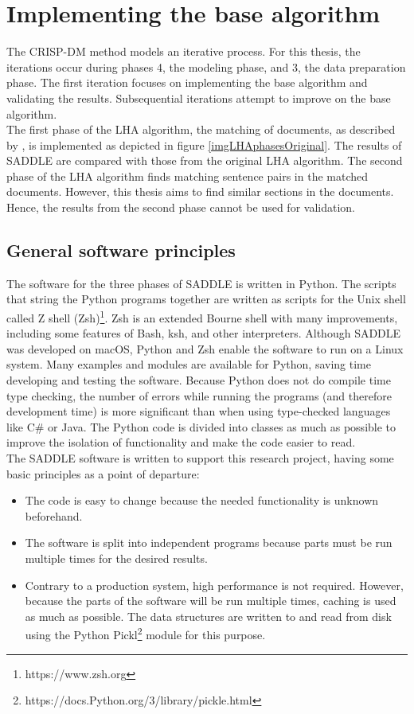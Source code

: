 \pagebreak
\chapter{Implementing the base algorithm}
\label{secRCIII}
The CRISP-DM method models an iterative process. For this thesis, the iterations occur during phases 4, the modeling phase, and 3, the data preparation phase. The first iteration focuses on implementing the base algorithm and validating the results. Subsequential iterations attempt to improve on the base algorithm.\\

The first phase of the LHA algorithm, the matching of documents, as described by \citet{nikolov2018large}, is implemented as depicted in figure \ref{imgLHAphasesOriginal}. The results of SADDLE are compared with those from the original LHA algorithm. The second phase of the LHA algorithm finds matching sentence pairs in the matched documents. However, this thesis aims to find similar sections in the documents. Hence, the results from the second phase cannot be used for validation. 

\section{General software principles}
\label{secGeneralPrinciples}

The software for the three phases of SADDLE is written in Python. The scripts that string the Python programs together are written as scripts for the Unix shell called Z shell (Zsh)\footnote{https://www.zsh.org}. Zsh is an extended Bourne shell with many improvements, including some features of Bash, ksh, and other interpreters. Although SADDLE was developed on macOS, Python and Zsh enable the software to run on a Linux system. Many examples and modules are available for Python, saving time developing and testing the software. Because Python does not do compile time type checking, the number of errors while running the programs (and therefore development time) is more significant than when using type-checked languages like C\# or Java. The Python code is divided into classes as much as possible to improve the isolation of functionality and make the code easier to read.\\

The SADDLE software is written to support this research project, having some basic principles as a point of departure:
\begin{itemize}
  \item The code is easy to change because the needed functionality is unknown beforehand.
  \item The software is split into independent programs because parts must be run multiple times for the desired results.
  \item Contrary to a production system, high performance is not required. However, because the parts of the software will be run multiple times, caching is used as much as possible. The data structures are written to and read from disk using the Python Pickl\footnote{https://docs.Python.org/3/library/pickle.html} module for this purpose.
\end{itemize}

